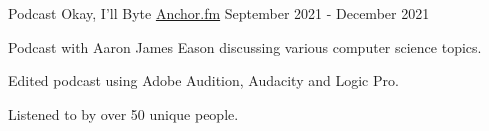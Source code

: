 \vspace{3mm}

\begin{cventries}
  \cventry
    {Podcast}
    {Okay, I'll Byte}
    {\href{https://anchor.fm/acm-podcast}{Anchor.fm}}
    {September 2021 - December 2021}
    {
      \begin{cvitems}
        \item {Podcast with Aaron James Eason discussing various computer science topics.}
        \item {Edited podcast using Adobe Audition, Audacity and Logic Pro.}
        \item {Listened to by over 50 unique people.}
      \end{cvitems}
    }  

\end{cventries}
